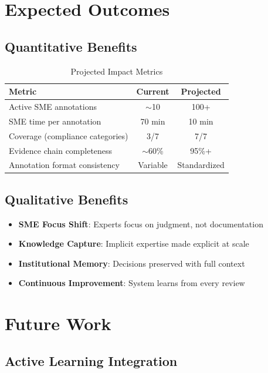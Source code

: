 \documentclass[11pt,a4paper]{article}
\begin{document}
\section{Expected Outcomes}

\subsection{Quantitative Benefits}

\begin{table}[H]
\centering
\caption{Projected Impact Metrics}
\begin{tabular}{lcc}
\toprule
\textbf{Metric} & \textbf{Current} & \textbf{Projected} \\
\midrule
Active SME annotations & $\sim$10 & 100+ \\
SME time per annotation & 70 min & 10 min \\
Coverage (compliance categories) & 3/7 & 7/7 \\
Evidence chain completeness & $\sim$60\% & 95\%+ \\
Annotation format consistency & Variable & Standardized \\
\bottomrule
\end{tabular}
\end{table}

\subsection{Qualitative Benefits}

\begin{itemize}
    \item \textbf{SME Focus Shift}: Experts focus on judgment, not documentation
    \item \textbf{Knowledge Capture}: Implicit expertise made explicit at scale
    \item \textbf{Institutional Memory}: Decisions preserved with full context
    \item \textbf{Continuous Improvement}: System learns from every review
\end{itemize}

\section{Future Work}

\subsection{Active Learning Integration}
\end{document}
